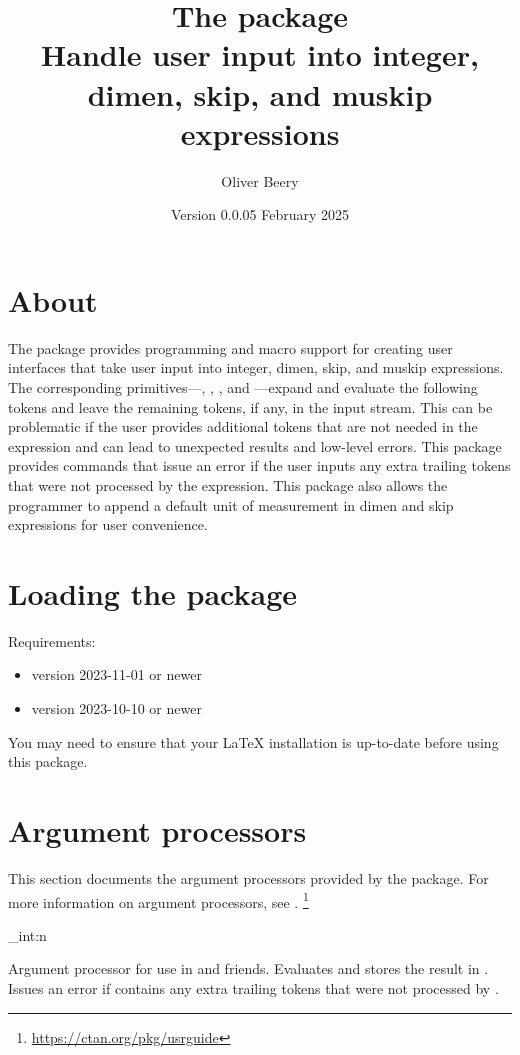 \documentclass{l3doc}
\title{The \pkg{argproc} package\\ Handle user input into integer, dimen, skip, and muskip expressions}
\author{Oliver Beery}
\date{Version 0.0.0\quad{}5 February 2025}
\begin{document}
\maketitle


\section{About}
\label{sec:about}

The  package provides  programming and macro support for creating user interfaces that take user input into integer, dimen, skip, and muskip expressions.
The corresponding \eTeX{} primitives---, , , and ---expand and evaluate the following tokens and leave the remaining tokens, if any, in the input stream.
This can be problematic if the user provides additional tokens that are not needed in the expression and can lead to unexpected results and low-level errors.
This package provides commands that issue an error if the user inputs any extra trailing tokens that were not processed by the expression.
This package also allows the programmer to append a default unit of measurement in dimen and skip expressions for user convenience.


\section{Loading the package}
\label{sec:loading the package}

Requirements:
\begin{itemize}
  \item \LaTeXe{} version 2023-11-01 or newer
  \item {} version 2023-10-10 or newer
\end{itemize}

You may need to ensure that your \LaTeX{} installation is up-to-date before using this package.


\section{Argument processors}
\label{sec:argumentprocessors}

This section documents the argument processors provided by the  package.
For more information on argument processors, see .%
\footnote{\url{https://ctan.org/pkg/usrguide}}

\begin{function}{\argproc_int:n}
  \begin{syntax}
     
  \end{syntax}
  Argument processor for use in  and friends.
  Evaluates  and stores the result in .
  Issues an error if  contains any extra trailing tokens that were not processed by .
\end{function}
\end{document}

